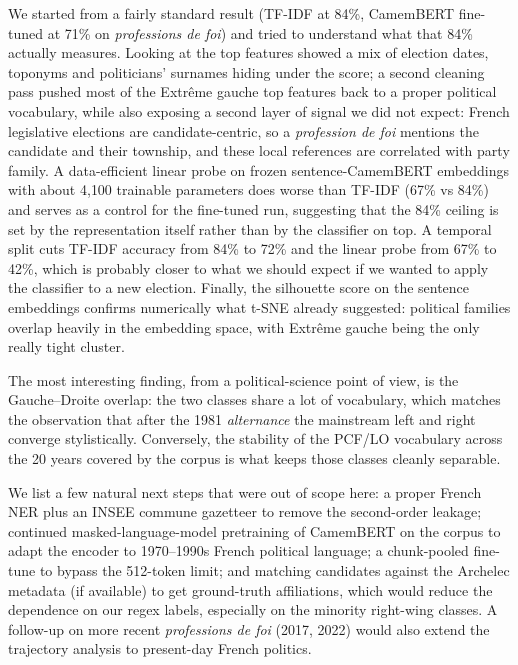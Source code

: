 \documentclass{article}
\begin{document}
We started from a fairly standard result (TF-IDF at 84\%, CamemBERT fine-tuned at 71\% on \textit{professions de foi}) and tried to understand what that 84\% actually measures. Looking at the top features showed a mix of election dates, toponyms and politicians' surnames hiding under the score; a second cleaning pass pushed most of the Extr\^{e}me gauche top features back to a proper political vocabulary, while also exposing a second layer of signal we did not expect: French legislative elections are candidate-centric, so a \textit{profession de foi} mentions the candidate and their township, and these local references are correlated with party family. A data-efficient linear probe on frozen sentence-CamemBERT embeddings with about 4{,}100 trainable parameters does worse than TF-IDF (67\% vs 84\%) and serves as a control for the fine-tuned run, suggesting that the 84\% ceiling is set by the representation itself rather than by the classifier on top. A temporal split cuts TF-IDF accuracy from 84\% to 72\% and the linear probe from 67\% to 42\%, which is probably closer to what we should expect if we wanted to apply the classifier to a new election. Finally, the silhouette score on the sentence embeddings confirms numerically what t-SNE already suggested: political families overlap heavily in the embedding space, with Extr\^{e}me gauche being the only really tight cluster.

The most interesting finding, from a political-science point of view, is the Gauche--Droite overlap: the two classes share a lot of vocabulary, which matches the observation that after the 1981 \textit{alternance} the mainstream left and right converge stylistically. Conversely, the stability of the PCF/LO vocabulary across the 20 years covered by the corpus is what keeps those classes cleanly separable.

We list a few natural next steps that were out of scope here: a proper French NER plus an INSEE commune gazetteer to remove the second-order leakage; continued masked-language-model pretraining of CamemBERT on the corpus to adapt the encoder to 1970--1990s French political language; a chunk-pooled fine-tune to bypass the 512-token limit; and matching candidates against the Archelec metadata (if available) to get ground-truth affiliations, which would reduce the dependence on our regex labels, especially on the minority right-wing classes. A follow-up on more recent \textit{professions de foi} (2017, 2022) would also extend the trajectory analysis to present-day French politics.
\end{document}
